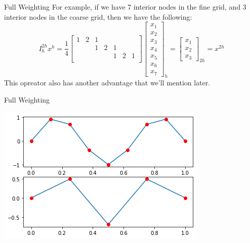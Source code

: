 \documentclass[11pt]{beamer}
\begin{document}
\begin{frame}{Full Weighting}
  For example, if we have 7 interior nodes in the fine grid, and 3 interior nodes in
  the coarse grid, then we have the following: \[
    I_{h}^{2h} x^{h} = \frac{1}{4} 
    \begin{bmatrix}
      1 & 2 & 1 &   &   &   & \\
      &   & 1 & 2 & 1 &   & \\
      &   &   &   & 1 & 2 & 1 \\
    \end{bmatrix}
    \begin{bmatrix}
      x_1 \\ x_2 \\ x_3 \\ x_4 \\ x_5 \\ x_6 \\ x_7
    \end{bmatrix}_{h}
    = \begin{bmatrix}
      x_1 \\ x_2 \\ x_3
    \end{bmatrix}_{2h} = x^{2h}
  \]
  This opreator also has another advantage that we'll mention later.
\end{frame}
\begin{frame}{Full Weighting}
  \begin{center}
    \includegraphics[width=\linewidth]{output_21_1.png}
  \end{center}
\end{frame}
\end{document}
